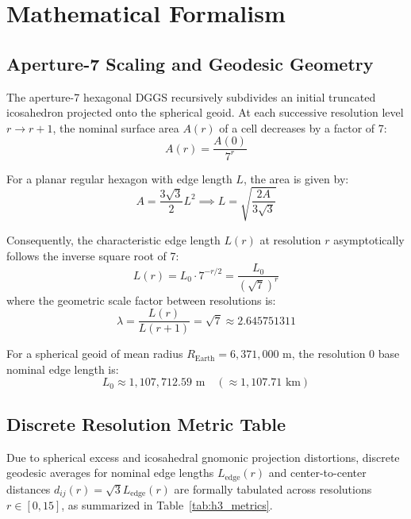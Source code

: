 \documentclass[11pt,a4paper]{article}
\begin{document}
\section{Mathematical Formalism}

\subsection{Aperture-7 Scaling and Geodesic Geometry}
The aperture-7 hexagonal DGGS recursively subdivides an initial truncated icosahedron projected onto the spherical geoid. At each successive resolution level $r \to r + 1$, the nominal surface area $A(r)$ of a cell decreases by a factor of 7:
\begin{equation}
A(r) = \frac{A(0)}{7^r}
\end{equation}

For a planar regular hexagon with edge length $L$, the area is given by:
\begin{equation}
A = \frac{3\sqrt{3}}{2} L^2 \implies L = \sqrt{\frac{2A}{3\sqrt{3}}}
\end{equation}

Consequently, the characteristic edge length $L(r)$ at resolution $r$ asymptotically follows the inverse square root of 7:
\begin{equation}
L(r) = L_0 \cdot 7^{-r/2} = \frac{L_0}{(\sqrt{7})^r}
\end{equation}
where the geometric scale factor between resolutions is:
\begin{equation}
\lambda = \frac{L(r)}{L(r+1)} = \sqrt{7} \approx 2.645751311
\end{equation}

For a spherical geoid of mean radius $R_{\text{Earth}} = 6{,}371{,}000\text{ m}$, the resolution 0 base nominal edge length is:
\begin{equation}
L_0 \approx 1{,}107{,}712.59\text{ m} \quad (\approx 1{,}107.71\text{ km})
\end{equation}

\subsection{Discrete Resolution Metric Table}
Due to spherical excess and icosahedral gnomonic projection distortions, discrete geodesic averages for nominal edge lengths $L_{\text{edge}}(r)$ and center-to-center distances $d_{ij}(r) = \sqrt{3} L_{\text{edge}}(r)$ are formally tabulated across resolutions $r \in [0, 15]$, as summarized in Table~\ref{tab:h3_metrics}.
\end{document}
